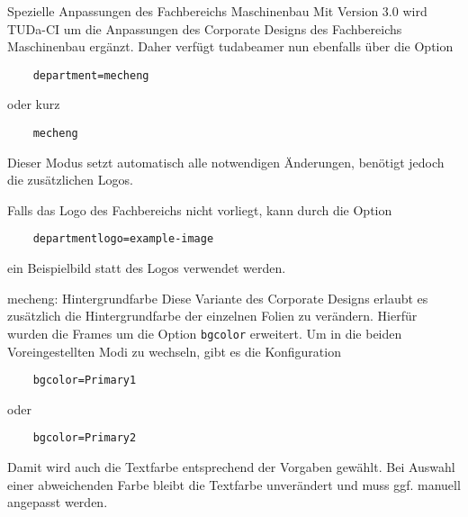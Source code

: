 \documentclass[
	ngerman,%
	aspectratio=169,%
	accentcolor=2d,%
	logo=false,%
	colorframetitle=true,%
	]{tudabeamer}
\let\code\texttt
\begin{document}
\begin{frame}[fragile]{Spezielle Anpassungen des Fachbereichs Maschinenbau}
	Mit Version 3.0 wird TUDa-CI um die Anpassungen des Corporate Designs des Fachbereichs Maschinenbau ergänzt.
	Daher verfügt tudabeamer nun ebenfalls über die Option 
	\begin{verbatim}
	department=mecheng
	\end{verbatim}
	oder kurz 
	\begin{verbatim}
	mecheng
	\end{verbatim}
	Dieser Modus setzt automatisch alle notwendigen Änderungen, benötigt jedoch die zusätzlichen Logos.
	
	Falls das Logo des Fachbereichs nicht vorliegt, kann durch die Option
	\begin{verbatim}
	departmentlogo=example-image
	\end{verbatim} ein Beispielbild statt des Logos verwendet werden.
\end{frame}

\begin{frame}[fragile]{mecheng: Hintergrundfarbe}
	Diese Variante des Corporate Designs erlaubt es zusätzlich die Hintergrundfarbe der einzelnen Folien zu verändern. Hierfür wurden die Frames um die Option \code{bgcolor} erweitert. Um in die beiden Voreingestellten Modi zu wechseln, gibt es die Konfiguration
	\begin{verbatim}
	bgcolor=Primary1
	\end{verbatim}
	oder
	\begin{verbatim}
	bgcolor=Primary2
	\end{verbatim}
	Damit wird auch die Textfarbe entsprechend der Vorgaben gewählt. Bei Auswahl einer abweichenden Farbe bleibt die Textfarbe unverändert und muss ggf. manuell angepasst werden.
\end{frame}
\end{document}
